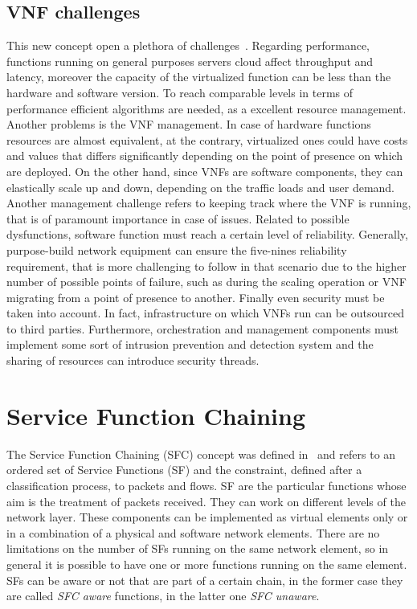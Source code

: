 \subsection{VNF challenges}
This new concept open a plethora of challenges~\cite{han2015network}. Regarding
performance, functions running on general purposes servers cloud affect
throughput and latency, moreover the capacity of the virtualized function can be
less than the hardware and software version. To reach comparable levels in terms
of performance efficient algorithms are needed, as a excellent resource
management. Another problems is the VNF management. In case of hardware
functions resources are almost equivalent, at the contrary, virtualized ones
could have costs and values that differs significantly depending on the point of
presence on which are deployed. On the other hand, since VNFs are software
components, they can elastically scale up and down, depending on the traffic
loads and user demand. Another management challenge refers to keeping track
where the VNF is running, that is of paramount importance in case of issues.
Related to possible dysfunctions, software function must reach a certain level
of reliability. Generally, purpose-build network equipment can ensure the
five-nines reliability requirement, that is more challenging to follow in that
scenario due to the higher number of possible points of failure, such as during
the scaling operation or VNF migrating from a point of presence to another.
Finally even security must be taken into account. In fact, infrastructure on
which VNFs run can be outsourced to third parties. Furthermore, orchestration
and management components must implement some sort of intrusion prevention and
detection system and the sharing of resources can introduce security threads.

\section{Service Function Chaining}
The Service Function Chaining (SFC) concept was defined
in~\cite{halpern2015service} and refers to an ordered set of Service Functions
(SF) and the constraint, defined after a classification process, to packets and
flows. SF are the particular functions whose aim is the treatment of packets
received. They can work on different levels of the network layer. These
components can be implemented as virtual elements only or in a combination of a
physical and software network elements. There are no limitations on the number
of SFs running on the same network element, so in general it is possible to have
one or more functions running on the same element. SFs can be aware or not that
are part of a certain chain, in the former case they are called \emph{SFC aware}
functions, in the latter one \emph{SFC unaware}.

